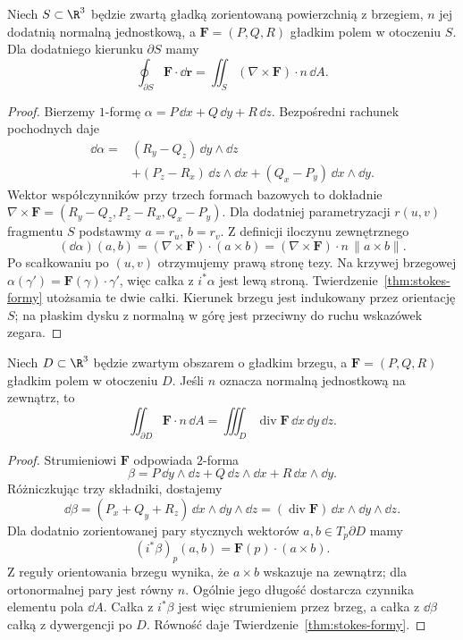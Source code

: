 \begin{wniosek}
\label{cor:stokes-curl}
Niech $S\subset\R^3$ będzie zwartą gładką
zorientowaną powierzchnią z brzegiem,
$n$ jej dodatnią normalną jednostkową,
a $\mathbf F=(P,Q,R)$ gładkim polem w otoczeniu $S$.
Dla dodatniego kierunku $\partial S$ mamy
\[
 \oint_{\partial S}\mathbf F\cdot\dd\mathbf r
 =\iint_S(\nabla\times\mathbf F)\cdot n\,\dd A.
\]
\end{wniosek}
\begin{proof}
Bierzemy $1$-formę
$\alpha=P\,\dd x+Q\,\dd y+R\,\dd z$.
Bezpośredni rachunek pochodnych daje
\[
 \begin{aligned}
 \dd\alpha={}&(R_y-Q_z)\,\dd y\wedge\dd z\\
 &+(P_z-R_x)\,\dd z\wedge\dd x
 +(Q_x-P_y)\,\dd x\wedge\dd y.
 \end{aligned}
\]
Wektor współczynników przy trzech formach
bazowych to dokładnie
$\nabla\times\mathbf F
=(R_y-Q_z,P_z-R_x,Q_x-P_y)$.
Dla dodatniej parametryzacji
$r(u,v)$ fragmentu $S$ podstawmy
$a=r_u$, $b=r_v$. Z definicji iloczynu
zewnętrznego
\[
 (\dd\alpha)(a,b)
 =(\nabla\times\mathbf F)\cdot(a\times b)
 =(\nabla\times\mathbf F)\cdot n\,
    \lVert a\times b\rVert.
\]
Po scałkowaniu po $(u,v)$ otrzymujemy prawą
stronę tezy. Na krzywej brzegowej
$\alpha(\gamma')=\mathbf F(\gamma)\cdot\gamma'$,
więc całka z $i^*\alpha$ jest lewą stroną.
Twierdzenie~\ref{thm:stokes-formy} utożsamia
te dwie całki. Kierunek brzegu jest
indukowany przez orientację $S$; na płaskim
dysku z normalną w górę jest przeciwny
do ruchu wskazówek zegara.
\end{proof}

\begin{wniosek}
\label{cor:stokes-gauss}
Niech $D\subset\R^3$ będzie zwartym obszarem
o gładkim brzegu, a $\mathbf F=(P,Q,R)$
gładkim polem w otoczeniu $D$.
Jeśli $n$ oznacza normalną jednostkową
na zewnątrz, to
\[
 \iint_{\partial D}\mathbf F\cdot n\,\dd A
 =\iiint_D\operatorname{div}\mathbf F\,
                  \dd x\,\dd y\,\dd z.
\]
\end{wniosek}
\begin{proof}
Strumieniowi $\mathbf F$ odpowiada $2$-forma
\[
 \beta=P\,\dd y\wedge\dd z
      +Q\,\dd z\wedge\dd x
      +R\,\dd x\wedge\dd y.
\]
Różniczkując trzy składniki, dostajemy
\[
 \dd\beta=(P_x+Q_y+R_z)\,
           \dd x\wedge\dd y\wedge\dd z
          =(\operatorname{div}\mathbf F)\,
           \dd x\wedge\dd y\wedge\dd z.
\]
Dla dodatnio zorientowanej pary stycznych
wektorów $a,b\in T_p\partial D$ mamy
\[
 (i^*\beta)_p(a,b)
 =\mathbf F(p)\cdot(a\times b).
\]
Z reguły orientowania brzegu wynika, że
$a\times b$ wskazuje na zewnątrz; dla
ortonormalnej pary jest równy $n$.
Ogólnie jego długość dostarcza czynnika
elementu pola $\dd A$. Całka z $i^*\beta$
jest więc strumieniem przez brzeg, a całka
z $\dd\beta$ całką z dywergencji po $D$.
Równość daje Twierdzenie~\ref{thm:stokes-formy}.
\end{proof}

